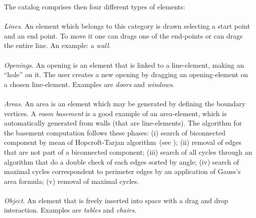 The catalog comprises then four different types of elements:\\\\
\noindent \emph{Lines}. An element which belongs to this category is drawn selecting a start point and an end point. To move it one can drags one of the end-points or can drags the entire line. An example: a \emph{wall}.\\\\
\noindent \emph{Openings}. An opening is an element that is linked to a line-element, making an ``hole'' on it. The user creates a new opening by dragging an opening-element on a chosen line-element. Examples are \emph{doors} and \emph{windows}.\\\\
\noindent \emph{Areas}. An area is an element which may be generated by defining the boundary vertices. A \emph{room basement} is a good example of an area-element, which is automatically generated from walls (that are line-elements). The algorithm for the basement computation follows these phases: (i) search of biconnected component by mean of Hopcroft-Tarjan algorithm~(see \cite{Hopcroft:1973:AEA:362248.362272}); (ii) removal of edges that are not part of a biconnected component; (iii) search of all cycles through an algorithm that do a double check of each edges sorted by angle; (iv) search of maximal cycles correspondent to perimeter edges by an application of Gauss's area formula; (v) removal of maximal cycles.\\\\
\noindent \emph{Object}. An element that is freely inserted into space with a drag and drop interaction. Examples are \emph{tables} and \emph{chairs}.\\\





